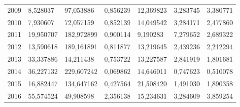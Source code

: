 \begin{table}
\begin{tabular}{p{1cm}p{2cm}p{2cm}p{2cm}p{2cm}p{2cm}p{2cm}}
 2009 &                         8,528037 &                                    97,053886 &        0,856239 &                   12,369823 &                                           3,283745 &           3,380771 \\
 2010 &                         7,930607 &                                    72,057159 &        0,852139 &                   14,049542 &                                           3,284171 &           2,477860 \\
 2011 &                        19,950707 &                                   182,972899 &        0,900114 &                    9,190283 &                                           7,279652 &           2,689322 \\
 2012 &                        13,590618 &                                   189,161891 &        0,811877 &                   13,219645 &                                           2,439236 &           2,212294 \\
 2013 &                        33,337886 &                                    14,211438 &        0,753722 &                   13,227587 &                                           2,841919 &           1,801681 \\
 2014 &                        36,227132 &                                   229,607242 &        0,069862 &                   14,646011 &                                           0,747623 &           0,510078 \\
 2015 &                        16,882447 &                                   134,647162 &        0,427564 &                   21,508420 &                                           1,491030 &           1,890358 \\
 2016 &                        55,574524 &                                    49,908598 &        2,356138 &                   15,234631 &                                           3,284609 &           3,859254 \\
\bottomrule
\end{tabular}
\end{table}
